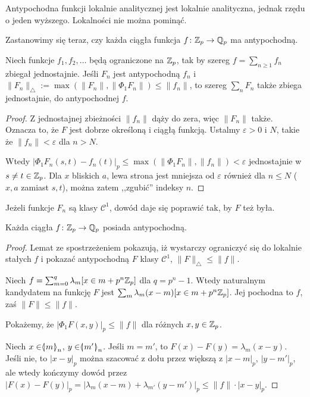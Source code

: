 \begin{fakt}
	Antypochodna  funkcji lokalnie analitycznej jest lokalnie analityczna, jednak rzędu o jeden wyższego.
	Lokalności nie można pominąć.
\end{fakt}

Zastanowimy się teraz, czy każda ciągła funkcja $f \colon \mathbb Z_p \to \mathbb Q_p$ ma antypochodną.

\begin{fakt}
	Niech  funkcje $f_1, f_2, \ldots$ będą ograniczone na $\mathbb Z_p$, tak by szereg $f = \sum_{n \ge 1} f_n$ zbiegał jednostajnie.
	Jeśli $F_n$ jest antypochodną $f_n$ i $\|F_n\|_\triangle := \max (\|F_n\|, \|\Phi_1 F_n\|) \le \|f_n\|$, to szereg $\sum_n F_n$ także zbiega jednostajnie, do antypochodnej $f$.
\end{fakt}

\begin{proof}
	Z jednostajnej zbieżności $\|f_n\|$ dąży do zera, więc $\|F_n\|$ także.
	Oznacza to, że $F$ jest dobrze określoną i ciągłą funkcją. Ustalmy $\varepsilon > 0$ i $N$, takie że $\|f_n\| <\varepsilon$ dla $n > N$.

	Wtedy $|\Phi_1 F_n(s,t) - f_n(t)|_p \le \max(\|\Phi_1 F_n\|, \|f_n\|) < \varepsilon$ jednostajnie w $s \neq  t \in \mathbb Z_p$.
	Dla $x$ bliskich $a$, lewa strona jest mniejsza od $\varepsilon$ również dla $n \le N$ ($x, a$ zamiast $s, t$), można zatem ,,zgubić'' indeksy $n$.
\end{proof}

Jeżeli funkcje $F_n$ są klasy $\mathcal C^1$, dowód daje się poprawić tak, by $F$ też była.

\begin{twierdzenie}[Dieudonné]
	Każda  ciągła $f \colon \mathbb Z_p \to \mathbb Q_p$ posiada antypochodną.
\end{twierdzenie}

\begin{proof}
	Lemat ze spostrzeżeniem pokazują, iż wystarczy ograniczyć się do lokalnie stałych $f$ i pokazać antypochodną $F$ klasy $\mathcal C^1$, $\|F\|_\triangle \le \|f\|$.

	Niech $f = \sum_{m=0}^{q} \lambda_m [x \in m + p^n\mathbb Z_p]$ dla $q = p^n-1$.
	Wtedy naturalnym kandydatem na funkcję $F$ jest $\sum_m \lambda_m (x-m) [x \in m + p^n\mathbb Z_p]$.
	Jej pochodna to $f$, zaś $\|F\| \le \|f\|$.

	Pokażemy, że $|\Phi_1 F(x,y)|_p \le \|f\|$ dla różnych $x, y \in \mathbb Z_p$.
	
	Niech $x \in \mathrel{\langle\mkern-3.85mu\mid\mkern-4mu} {m}\mathrel{\mkern-4mu\mid\mkern-3.85mu\rangle}_{n}$, $y \in \mathrel{\langle\mkern-3.85mu\mid\mkern-4mu} {m'}\mathrel{\mkern-4mu\mid\mkern-3.85mu\rangle}_{n}$.
	Jeśli $m = m'$, to $F(x) - F(y) = \lambda_m (x - y)$.
	Jeśli nie, to $|x-y|_p$ można szacować z dołu przez większą z $|x - m|_p$, $|y - m'|_p$, ale wtedy kończymy dowód przez $|F(x) - F(y)|_p = |\lambda_m(x - m) + \lambda_{m'}(y - m')|_p \le \|f\| \cdot |x -y|_p$.
\end{proof}

